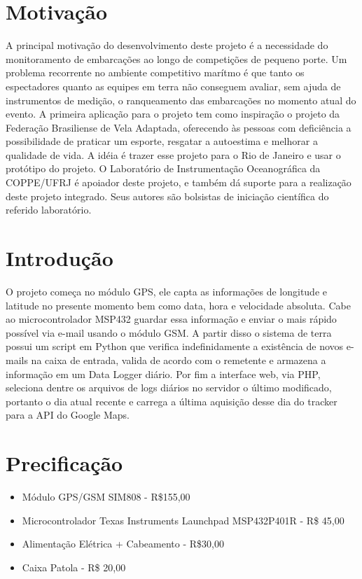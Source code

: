 \section{Motivação}
\hspace{0.5cm} A principal motivação do desenvolvimento deste projeto é a necessidade do monitoramento de embarcações ao longo de competições de pequeno porte.
Um problema recorrente no ambiente competitivo marítmo é que tanto os espectadores quanto as equipes em terra não conseguem avaliar, sem ajuda de instrumentos de medição, o ranqueamento das embarcações no momento atual do evento. A primeira aplicação para o projeto tem como inspiração o projeto da Federação Brasiliense de Vela Adaptada, oferecendo às pessoas com deficiência a possibilidade de praticar um esporte, resgatar a autoestima e melhorar a qualidade de vida. A idéia é trazer esse projeto para o Rio de Janeiro e usar o protótipo do projeto. O Laboratório de Instrumentação Oceanográfica da COPPE/UFRJ é apoiador deste projeto, e também dá suporte para a realização deste projeto integrado. Seus autores são bolsistas de iniciação científica do referido laboratório.

\section{Introdução}
\hspace{0.5cm} O projeto começa no módulo GPS, ele capta as informações de longitude e latitude no presente momento bem como data, hora e velocidade absoluta. Cabe ao microcontrolador MSP432 guardar essa informação e enviar o mais rápido possível via e-mail usando o módulo GSM. A partir disso o sistema de terra possui um script em Python que verifica indefinidamente a existência de novos e-mails na caixa de entrada, valida de acordo com o remetente e armazena a informação em um Data Logger diário. Por fim a interface web, via PHP, seleciona dentre os arquivos de logs diários no servidor o último modificado, portanto o dia atual recente e carrega a última aquisição desse dia do tracker para a API do Google Maps.

\section{Precificação}
\begin{itemize}
\item Módulo GPS/GSM SIM808 - R\$155,00
\end{itemize}
\begin{itemize}
\item Microcontrolador Texas Instruments Launchpad MSP432P401R - R\$ 45,00
\end{itemize}
\begin{itemize}
\item Alimentação Elétrica + Cabeamento - R\$30,00
\end{itemize}
\begin{itemize}
\item Caixa Patola - R\$ 20,00
\end{itemize}

